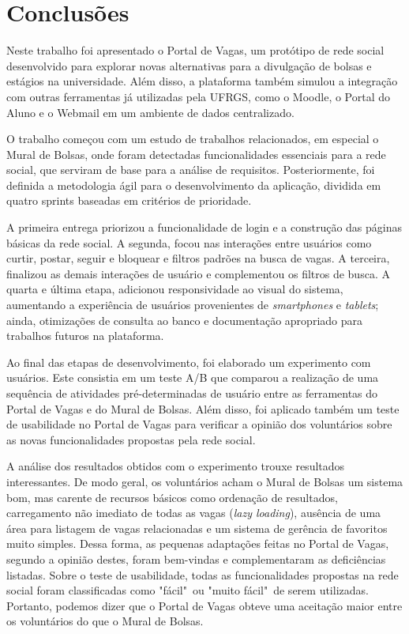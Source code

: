 \chapter{Conclusões}
\label{conclusao}

Neste trabalho foi apresentado o Portal de Vagas, um protótipo de rede social desenvolvido para explorar novas alternativas para a divulgação de bolsas e estágios na universidade. Além disso, a plataforma também simulou a integração com outras ferramentas já utilizadas pela UFRGS, como o Moodle, o Portal do Aluno e o Webmail em um ambiente de dados centralizado.

O trabalho começou com um estudo de trabalhos relacionados, em especial o Mural de Bolsas, onde foram detectadas funcionalidades essenciais para a rede social, que serviram de base para a análise de requisitos. Posteriormente, foi definida a metodologia ágil para o desenvolvimento da aplicação, dividida em quatro sprints baseadas em critérios de prioridade. 

A primeira entrega priorizou a funcionalidade de login e a construção das páginas básicas da rede social. A segunda, focou nas interações entre usuários como curtir, postar, seguir e bloquear e filtros padrões na busca de vagas. A terceira, finalizou as demais interações de usuário e complementou os filtros de busca. A quarta e última etapa, adicionou responsividade ao visual do sistema, aumentando a experiência de usuários provenientes de \textit{smartphones} e \textit{tablets}; ainda, otimizações de consulta ao banco e documentação apropriado para trabalhos futuros na plataforma.

Ao final das etapas de desenvolvimento, foi elaborado um experimento com usuários. Este consistia em um teste A/B que comparou a realização de uma sequência de atividades pré-determinadas de usuário entre as ferramentas do Portal de Vagas e do Mural de Bolsas. Além disso, foi aplicado também um teste de usabilidade no Portal de Vagas para verificar a opinião dos voluntários sobre as novas funcionalidades propostas pela rede social.

A análise dos resultados obtidos com o experimento trouxe resultados interessantes. De modo geral, os voluntários acham o Mural de Bolsas um sistema bom, mas carente de recursos básicos como ordenação de resultados, carregamento não imediato de todas as vagas (\textit{lazy loading}), ausência de uma área para listagem de vagas relacionadas e um sistema de gerência de favoritos muito simples. Dessa forma, as pequenas adaptações feitas no Portal de Vagas, segundo a opinião destes, foram bem-vindas e complementaram as deficiências listadas. Sobre o teste de usabilidade, todas as funcionalidades propostas na rede social foram classificadas como "fácil"\ ou "muito fácil"\ de serem utilizadas. Portanto, podemos dizer que o Portal de Vagas obteve uma aceitação maior entre os voluntários do que o Mural de Bolsas.

